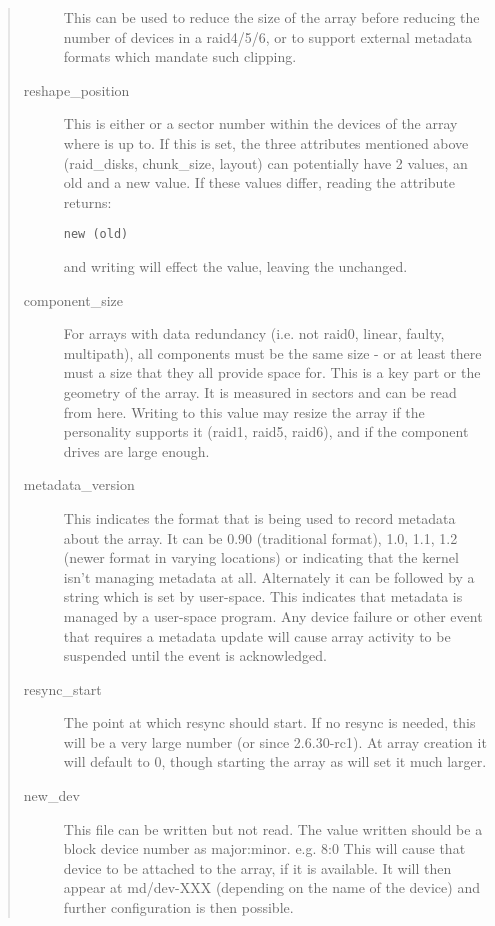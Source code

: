 \documentclass[a4paper,8pt,english]{sphinxmanual}
\begin{document}
\begin{quote}
\begin{description}
This can be used to reduce the size of the array before reducing
the number of devices in a raid4/5/6, or to support external
metadata formats which mandate such clipping.

\item[{reshape\_position}] \leavevmode
This is either  or a sector number within the devices of
the array where  is up to.  If this is set, the three
attributes mentioned above (raid\_disks, chunk\_size, layout) can
potentially have 2 values, an old and a new value.  If these
values differ, reading the attribute returns:

\begin{Verbatim}[commandchars=\\\{\}]
new (old)
\end{Verbatim}

and writing will effect the  value, leaving the 
unchanged.

\item[{component\_size}] \leavevmode
For arrays with data redundancy (i.e. not raid0, linear, faulty,
multipath), all components must be the same size - or at least
there must a size that they all provide space for.  This is a key
part or the geometry of the array.  It is measured in sectors
and can be read from here.  Writing to this value may resize
the array if the personality supports it (raid1, raid5, raid6),
and if the component drives are large enough.

\item[{metadata\_version}] \leavevmode
This indicates the format that is being used to record metadata
about the array.  It can be 0.90 (traditional format), 1.0, 1.1,
1.2 (newer format in varying locations) or  indicating that
the kernel isn't managing metadata at all.
Alternately it can be  followed by a string which
is set by user-space.  This indicates that metadata is managed
by a user-space program.  Any device failure or other event that
requires a metadata update will cause array activity to be
suspended until the event is acknowledged.

\item[{resync\_start}] \leavevmode
The point at which resync should start.  If no resync is needed,
this will be a very large number (or  since 2.6.30-rc1).  At
array creation it will default to 0, though starting the array as
 will set it much larger.

\item[{new\_dev}] \leavevmode
This file can be written but not read.  The value written should
be a block device number as major:minor.  e.g. 8:0
This will cause that device to be attached to the array, if it is
available.  It will then appear at md/dev-XXX (depending on the
name of the device) and further configuration is then possible.


\end{description}
\end{quote}
\end{document}
